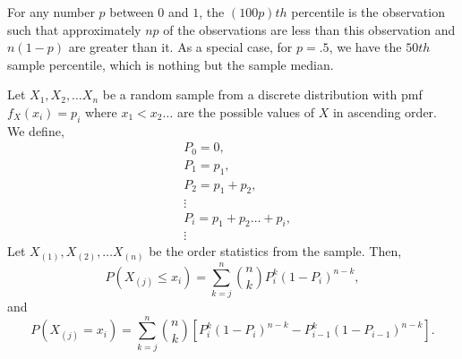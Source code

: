 \documentclass[a4paper,english,12pt]{article}
\begin{document}
\begin{defn}
For any number $p$ between $0$ and $1$, the $(100p)th$ percentile is the observation such that approximately $np$ of the observations are less than this observation and $n(1-p)$ are greater than it. As a special case, for $p=.5$, we have the $50th$ sample percentile, which is nothing but the sample median.
\end{defn}
\begin{thm} \label{theorem:thm_5.4.3_casella_berger}
Let $X_1,X_2, \dots X_n$ be a random sample from a discrete distribution with pmf $f_X(x_i)=p_i$ where $x_1<x_2 \ldots $ are the possible values of $X$ in ascending order. We define,
\begin{align}
& P_0=0, \nonumber \\
& P_1=p_1,\nonumber \\
& P_2=p_1+p_2, \\ \nonumber
& \vdots  \nonumber \\ \nonumber
& P_i=p_1+p_2\ldots +p_i, \\ \nonumber
& \vdots 
\end{align}
Let $X_{(1)},X_{(2)},\dots X_{(n)}$ be the order statistics from the sample. Then,
\begin{equation} \label{eqn:casella berger pg 228 eq 5.4.2}
P(X_{(j)} \leq x_i)={\sum\limits_{k=j}^n} \binom{n}{k} P_i ^{k} (1-P_i)^{n-k},
\end{equation}
and
\begin{equation} \label{eqn2:casella berger pg 228 eq 5.4.3}
P(X_{(j)} = x_i)={\sum\limits_{k=j}^n} \binom{n}{k} [P_i ^{k} (1-P_i)^{n-k} - P_{i-1} ^{k} (1-P_{i-1})^{n-k}].
\end{equation}
\end{thm}
\end{document}
